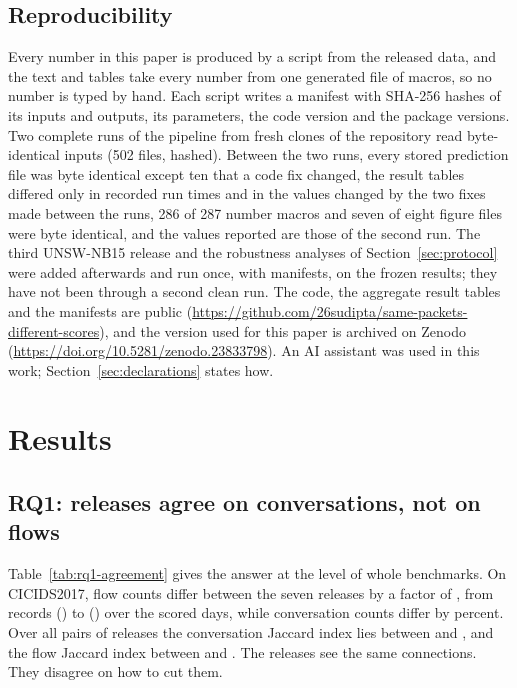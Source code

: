 \documentclass[pdflatex,sn-mathphys-num]{sn-jnl}
\newcommand{\docnum}[1]{#1}
\newcommand{\cicids}{CICIDS2017}
\theoremstyle{thmstyleone}%
\theoremstyle{thmstylethree}%
\begin{document}


\subsection{Reproducibility}

Every number in this paper is produced by a script from the released data, and the text and tables take every number from one generated file of macros, so no number is typed by hand. Each script writes a manifest with SHA-256 hashes of its inputs and outputs, its parameters, the code version and the package versions. Two complete runs of the pipeline from fresh clones of the repository read byte-identical inputs (\docnum{502} files, hashed). Between the two runs, every stored prediction file was byte identical except \docnum{ten} that a code fix changed, the result tables differed only in recorded run times and in the values changed by the two fixes made between the runs, \docnum{286} of \docnum{287} number macros and \docnum{seven} of \docnum{eight} figure files were byte identical, and the values reported are those of the second run. The third UNSW-NB15 release and the robustness analyses of Section~\ref{sec:protocol} were added afterwards and run once, with manifests, on the frozen results; they have not been through a second clean run. The code, the aggregate result tables and the manifests are public (\url{https://github.com/26sudipta/same-packets-different-scores}), and the version used for this paper is archived on Zenodo (\url{https://doi.org/10.5281/zenodo.23833798}). An AI assistant was used in this work; Section~\ref{sec:declarations} states how.

\section{Results}\label{sec:results}

\subsection{RQ1: releases agree on conversations, not on flows}\label{sec:rq1}

Table~\ref{tab:rq1-agreement} gives the answer at the level of whole benchmarks. On \cicids, flow counts differ between the seven releases by a factor of \RQoneFlowRatio{}, from \RQoneFlowsMin{} records (\RQoneFlowsMinArm{}) to \RQoneFlowsMax{} (\RQoneFlowsMaxArm{}) over the scored days, while conversation counts differ by \RQoneConvSpread{} percent. Over all \RQonePairs{} pairs of releases the conversation Jaccard index lies between \RQoneConvJaccardMin{} and \RQoneConvJaccardMax{}, and the flow Jaccard index between \RQoneFlowJaccardMin{} and \RQoneFlowJaccardMax{}. The releases see the same connections. They disagree on how to cut them.
\end{document}
